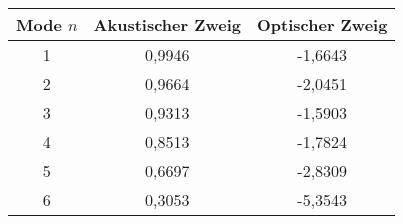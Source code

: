 \begin{tabular}{ccc}
\toprule
Mode $n$&Akustischer Zweig&Optischer Zweig\\
\midrule
1&0,9946&-1,6643\\
2&0,9664&-2,0451\\
3&0,9313&-1,5903\\
4&0,8513&-1,7824\\
5&0,6697&-2,8309\\
6&0,3053&-5,3543\\
\bottomrule
\end{tabular}